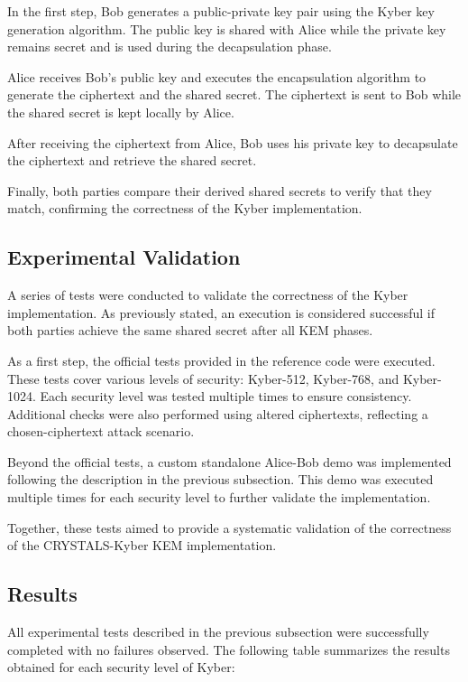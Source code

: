 \documentclass[12pt]{article}
\begin{document}
In the first step, Bob generates a public-private key pair using the Kyber key generation algorithm. The public key is shared with Alice while the private key remains secret and is used during the decapsulation phase.

Alice receives Bob's public key and executes the encapsulation algorithm to generate the ciphertext and the shared secret. The ciphertext is sent to Bob while the shared secret is kept locally by Alice.

After receiving the ciphertext from Alice, Bob uses his private key to decapsulate the ciphertext and retrieve the shared secret. 

Finally, both parties compare their derived shared secrets to verify that they match, confirming the correctness of the Kyber implementation.




\subsection{Experimental Validation}

A series of tests were conducted to validate the correctness of the Kyber implementation. As previously stated, an execution is considered successful if both parties achieve the same shared secret after all KEM phases.

As a first step, the official tests provided in the reference code were executed. These tests cover various levels of security: Kyber-512, Kyber-768, and Kyber-1024. Each security level was tested multiple times to ensure consistency. Additional checks were also performed using altered ciphertexts, reflecting a chosen-ciphertext attack scenario.

Beyond the official tests, a custom standalone Alice-Bob demo was implemented following the description in the previous subsection. This demo was executed multiple times for each security level to further validate the implementation.

Together, these tests aimed to provide a systematic validation of the correctness of the CRYSTALS-Kyber KEM implementation.





\subsection{Results}

All experimental tests described in the previous subsection were successfully completed with no failures observed. The following table summarizes the results obtained for each security level of Kyber:
\end{document}
